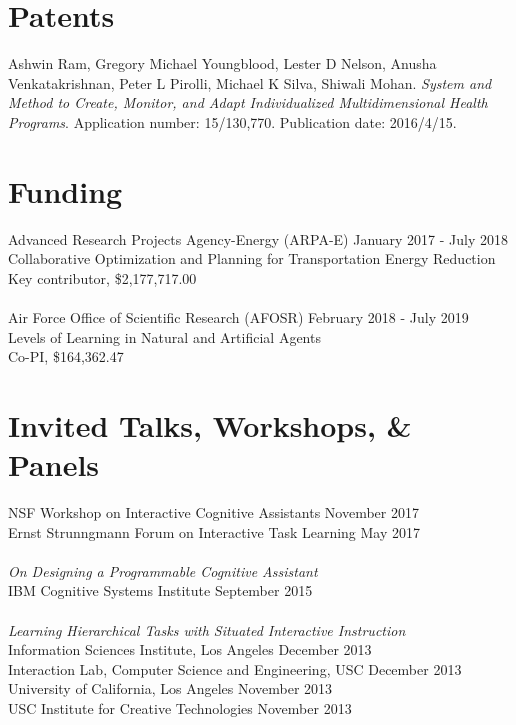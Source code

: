 \documentclass[margin,line,11pt]{res}
\begin{document}
\begin{resume}
\section{\sc Patents}
Ashwin Ram, Gregory Michael Youngblood, Lester D Nelson, Anusha Venkatakrishnan, Peter L Pirolli, Michael K Silva, Shiwali Mohan. \emph{System and Method to Create, Monitor, and Adapt Individualized Multidimensional Health Programs}. Application number: 15/130,770. Publication date: 2016/4/15.



\section{\sc Funding}
Advanced Research Projects Agency-Energy (ARPA-E) \hfill January 2017 - July 2018 \\
Collaborative Optimization and Planning for Transportation Energy Reduction\\
Key contributor, \$2,177,717.00\\
\\
Air Force Office of Scientific Research (AFOSR) \hfill February 2018 - July 2019\\
Levels of Learning in Natural and Artificial Agents\\
Co-PI, \$164,362.47\\



\section{\sc Invited Talks, Workshops, \& Panels}
NSF Workshop on Interactive Cognitive Assistants \hfill November 2017\\
Ernst Strunngmann Forum on Interactive Task Learning \hfill May 2017\\ \\
\emph{On Designing a Programmable Cognitive Assistant}\\ IBM Cognitive Systems Institute \hfill September 2015\\ \\
\emph{Learning Hierarchical Tasks with Situated Interactive Instruction}\\ Information Sciences Institute, Los Angeles \hfill December 2013\\
Interaction Lab, Computer Science and Engineering, USC \hfill December 2013\\
University of California, Los Angeles \hfill November 2013\\
USC Institute for Creative Technologies \hfill November 2013


\end{resume}
\end{document}
